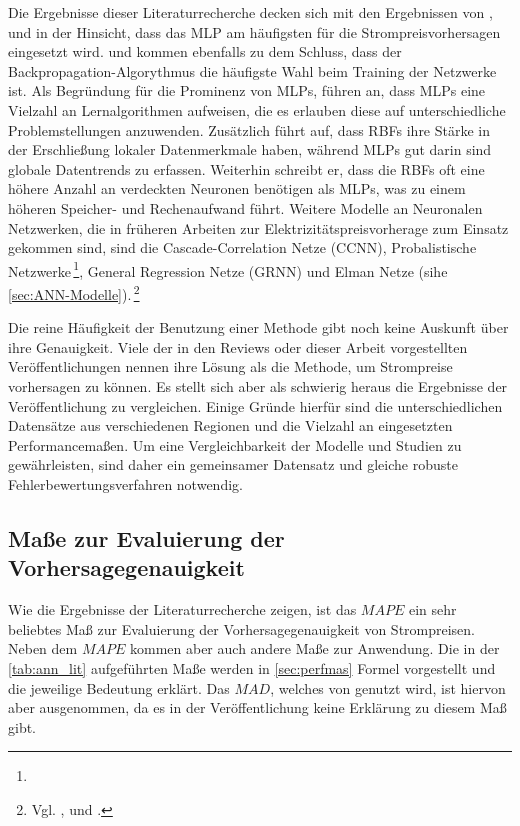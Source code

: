 Die Ergebnisse dieser Literaturrecherche decken sich mit den Ergebnissen von \citet{Aggarwal2009}, \citet{Weron2014} und \citet{Panapakidis2016} in der Hinsicht, dass das MLP am häufigsten für die Strompreisvorhersagen eingesetzt wird. \citet{Aggarwal2009} und \citet{Weron2014} kommen ebenfalls zu dem Schluss, dass der Backpropagation-Algorythmus die häufigste Wahl beim Training der Netzwerke ist. Als Begründung für die Prominenz von MLPs, führen \citet{Panapakidis2016} an, dass MLPs eine Vielzahl an Lernalgorithmen aufweisen, die es erlauben diese auf unterschiedliche Problemstellungen anzuwenden. Zusätzlich führt \citet{Weron2014} auf, dass RBFs ihre Stärke in der Erschließung lokaler Datenmerkmale haben, während MLPs gut darin sind globale Datentrends zu erfassen. Weiterhin schreibt er, dass die RBFs oft eine höhere Anzahl an verdeckten Neuronen benötigen als MLPs, was zu einem höheren Speicher- und Rechenaufwand führt. 
Weitere Modelle an Neuronalen Netzwerken, die in früheren Arbeiten zur Elektrizitätspreisvorherage zum Einsatz gekommen sind, sind die Cascade-Correlation Netze (CCNN), Probalistische Netzwerke\,\footnote{}, General Regression Netze (GRNN) und Elman Netze (sihe \autoref{sec:ANN-Modelle}).\,\footnote{Vgl. \citet[757]{Cerjan2013}, \citet[28 ff]{Weron2014} und \citet[134]{Panapakidis2016}.}

Die reine Häufigkeit der Benutzung einer Methode gibt noch keine Auskunft über ihre Genauigkeit. Viele der in den Reviews oder dieser Arbeit vorgestellten Veröffentlichungen nennen ihre Lösung als die Methode, um Strompreise vorhersagen zu können. Es stellt sich aber als schwierig heraus die Ergebnisse der Veröffentlichung zu vergleichen. Einige Gründe hierfür sind die unterschiedlichen Datensätze aus verschiedenen Regionen und die Vielzahl an eingesetzten Performancemaßen. Um eine Vergleichbarkeit der Modelle und Studien zu gewährleisten, sind daher ein gemeinsamer Datensatz und gleiche robuste Fehlerbewertungsverfahren notwendig.\, %

\subsection{Maße zur Evaluierung der Vorhersagegenauigkeit}\label{sec:eval_maße}

Wie die Ergebnisse der Literaturrecherche zeigen, ist das $MAPE$ ein sehr beliebtes Maß zur Evaluierung der Vorhersagegenauigkeit von Strompreisen. Neben dem $MAPE$ kommen aber auch andere Maße zur Anwendung. Die in der \autoref{tab:ann_lit} aufgeführten Maße werden in \autoref{sec:perfmas} Formel vorgestellt und die jeweilige Bedeutung erklärt. Das $MAD$, welches von \citet{Keles2016} genutzt wird, ist hiervon aber ausgenommen, da es in der Veröffentlichung keine Erklärung zu diesem Maß gibt.

